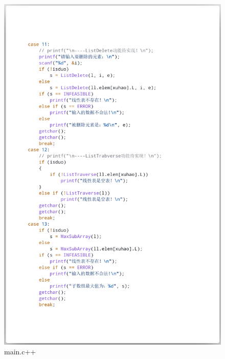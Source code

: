 \documentclass[supercite]{Experimental_Report}
\theoremstyle{definition}
\begin{document}
\begin{figure}[htb]
	\begin{center}
		\includegraphics[scale=0.30]{images/3-13.png}
		\caption{main.c++}
		\label{fig3-13}
	\end{center}
\end{figure}
\end{document}
